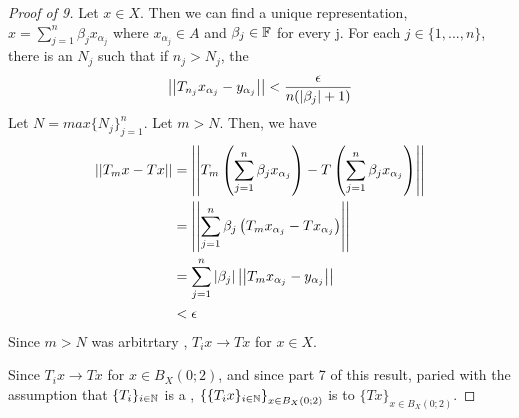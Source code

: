 \begin{prop}
\begin{proof}[Proof of 9]
    Let $x \in X$. 
    Then we can find a unique representation, 
    $x=\sum_{j=1}^n \beta_j x_{\alpha_j}$ where $x_{\alpha_j} \in A$ and $\beta_j \in \mathbb{F}$ for every j. 
    For each $j \in \{1, ..., n\}$, there is an $N_j$ such that if
    $n_j > N_j$, the 
    \begin{equation}
    \left|\left| T_{n_j} x_{\alpha_j} -y_{\alpha_j} \right|\right| < \frac{\epsilon}{n(\left| \beta_j \right|+1)}
    \end{equation}
    Let $N=max\{N_j\}_{j=1}^n$. 
    Let $m>N$. 
    Then, we have 
    \begin{align*}
        \left|\left| T_mx-Tx \right|\right| & = \left|\left| T_m\left( \sum_{j=1}^n \beta_j x_{\alpha_j}\right)-T\left( \sum_{j=1}^n \beta_j x_{\alpha_j}\right) \right|\right|\\
        & = \left|\left| \sum_{j=1}^n \beta_j \left( T_mx_{\alpha_j}-Tx_{\alpha_j}\right) \right|\right|\\
        & = \sum_{j=1}^n \left| \beta_j \right| \left|\left| T_mx_{\alpha_j}-y_{\alpha_j} \right|\right|\\
        & < \epsilon 
    \end{align*}
    Since $m>N$ was arbitrtary , 
    $T_ix \to Tx$ for $x \in X$. 

    Since $T_ix \to Tx$ for $x \in B_X(0;2)$, 
    and since part 7 of this result, 
    paried with the assumption that
    $\{T_i\}_{i \in \mathbb{N}}$ is a \PseudometricCauchySequence, 
    $\left\{\{T_ix\}_{i \in \mathbb{N}}\right\}_{x \in B_X(0;2)}$ 
    is \UniformlyConvergent
    to $\{Tx\}_{x \in B_X(0;2)}$. 


\end{proof}
\end{prop}
